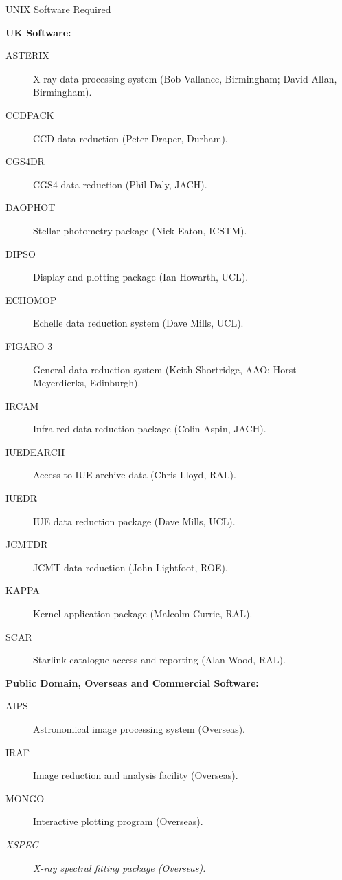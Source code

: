 \vspace{5mm}
\begin{center}
{\large\sc UNIX Software Required}
\end{center}

\begin{center}
{\bf UK Software:}
\end{center}

\begin{description}
\item[ASTERIX] X-ray data processing system (Bob Vallance, Birmingham;
David Allan, Birmingham).
\item[CCDPACK] CCD data reduction (Peter Draper, Durham).
\item[CGS4DR] CGS4 data reduction (Phil Daly, JACH).
\item[DAOPHOT] Stellar photometry package (Nick Eaton, ICSTM).
\item[DIPSO] Display and plotting package (Ian Howarth, UCL).
\item[ECHOMOP] Echelle data reduction system (Dave Mills, UCL).
\item[FIGARO 3] General data reduction system (Keith Shortridge, AAO; Horst
Meyerdierks, Edinburgh).
\item[IRCAM] Infra-red data reduction package (Colin Aspin, JACH).
\item[IUEDEARCH] Access to IUE archive data (Chris Lloyd, RAL).
\item[IUEDR] IUE data reduction package (Dave Mills, UCL).
\item[JCMTDR] JCMT data reduction (John Lightfoot, ROE).
\item[KAPPA] Kernel application package (Malcolm Currie, RAL).
\item[SCAR] Starlink catalogue access and reporting (Alan Wood, RAL).
\end{description}


\vspace{5mm}
\begin{center}
{\bf Public Domain, Overseas and Commercial Software:}
\end{center}

\begin{description}
\item[AIPS] Astronomical image processing system (Overseas).
\item[IRAF] Image reduction and analysis facility (Overseas).
\item[MONGO] Interactive plotting program (Overseas).
\item[{\em XSPEC}] {\em X-ray spectral fitting package (Overseas).}
\end{description}


